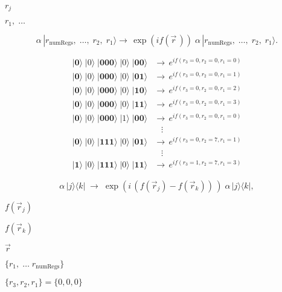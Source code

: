 \documentclass{article}
\begin{document}
$r_j$
\pagebreak

$r_1, \; \dots$
\pagebreak

\[
   \alpha \, |r_{\text{numRegs}}, \; \dots, \; r_2, \; r_1 \rangle \rightarrow \, \exp(i f(\vec{r}\,)) \; \alpha \, |r_{\text{numRegs}}, \; \dots, \; r_2, \; r_1 \rangle.
  \]
\pagebreak

\[ 
  \begin{aligned}
    |\mathbf{0}\rangle \; |0\rangle \; |\mathbf{000}\rangle \; |0\rangle \; |\mathbf{00}\rangle & 
       \rightarrow \, 
           e^{i f(r_3=0,r_2=0,r_1=0)} \\
    |\mathbf{0}\rangle \; |0\rangle \; |\mathbf{000}\rangle \; |0\rangle \; |\mathbf{01}\rangle & 
       \rightarrow \, 
           e^{i f(r_3=0,r_2=0,r_1=1)} \\
    |\mathbf{0}\rangle \; |0\rangle \; |\mathbf{000}\rangle \; |0\rangle \; |\mathbf{10}\rangle & 
       \rightarrow \, 
           e^{i f(r_3=0,r_2=0,r_1=2)} \\
    |\mathbf{0}\rangle \; |0\rangle \; |\mathbf{000}\rangle \; |0\rangle \; |\mathbf{11}\rangle & 
       \rightarrow \, 
           e^{i f(r_3=0,r_2=0,r_1=3)} \\
    |\mathbf{0}\rangle \; |0\rangle \; |\mathbf{000}\rangle \; |1\rangle \; |\mathbf{00}\rangle & 
       \rightarrow \, 
           e^{i f(r_3=0,r_2=0,r_1=0)} \\
  & \;\;\;\vdots \\
    |\mathbf{0}\rangle \; |0\rangle \; |\mathbf{111}\rangle \; |0\rangle \; |\mathbf{01}\rangle & 
       \rightarrow \, 
           e^{i f(r_3=0,r_2=7,r_1=1)} \\
  & \;\;\;\vdots \\
    |\mathbf{1}\rangle \; |0\rangle \; |\mathbf{111}\rangle \; |0\rangle \; |\mathbf{11}\rangle & 
       \rightarrow \, 
           e^{i f(r_3=1,r_2=7,r_1=3)}
  \end{aligned}
  \]
\pagebreak

\[
     \alpha \, |j\rangle\langle k| \; \rightarrow \;
         \exp(i \, (f(\vec{r}_j) - f(\vec{r}_k)) \, ) \; \alpha \, |j\rangle\langle k|,
  \]
\pagebreak

$f(\vec{r}_j)$
\pagebreak

$f(\vec{r}_k)$
\pagebreak

$\vec{r}$
\pagebreak

$\{r_1,\; \dots \;r_{\text{numRegs}} \} $
\pagebreak

$\{r_3,r_2,r_1\} = \{0, 0, 0\}$
\pagebreak
\end{document}

